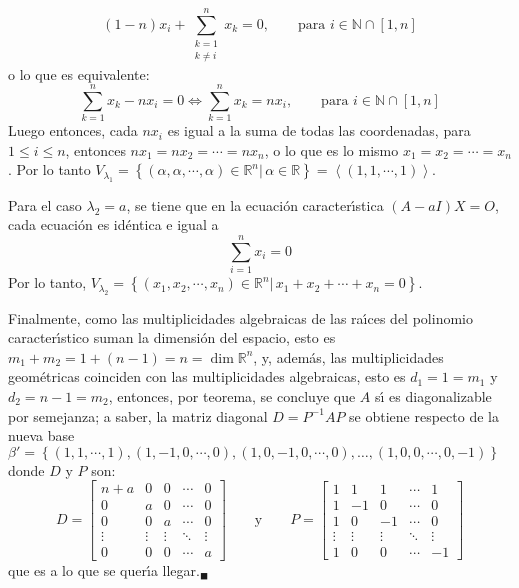\begin{solucion}
 \begin{equation*}
  (1-n)x_i + \sum_{\substack{k=1\\k\neq i}}^n x_k = 0, \qquad \text{para } i \in \mathbb{N}\cap[1, n]
 \end{equation*}
 o lo que es equivalente:
 \begin{equation*}
  \sum_{k=1}^n x_k - nx_i = 0
  \Leftrightarrow 
  \sum_{k=1}^n x_k = nx_i
  , \qquad \text{para } i \in \mathbb{N}\cap [1,n]
 \end{equation*}
 Luego entonces, cada $nx_i$ es igual a la suma de todas las coordenadas, para $1\leq i \leq n$, entonces $nx_1 = nx_2 = \cdots = nx_n$, o lo que es lo mismo $x_1 = x_2 = \cdots = x_n$. Por lo tanto $V_{\lambda_1} = \left\{ (\alpha, \alpha, \cdots, \alpha) \in \mathbb{R}^n | \, \alpha \in \mathbb{R} \right\} = \left< (1, 1, \cdots , 1) \right>$.
 \par 
 Para el caso $\lambda_2 = a$, se tiene que en la ecuaci\'on caracter\'{\i}stica $(A - aI)X = O$, cada ecuaci\'on es id\'entica e igual a
 \begin{equation*}
  \sum_{i=1}^n x_i = 0
 \end{equation*}
 Por lo tanto, $V_{\lambda_2} = \left\{ (x_1, x_2, \cdots, x_n) \in \mathbb{R}^n | \, x_1 + x_2 + \cdots + x_n = 0 \right\}$.
 \par 
 Finalmente, como las multiplicidades algebraicas de las ra\'{\i}ces del polinomio caracter\'{\i}stico suman la dimensi\'on del espacio, esto es $m_1 + m_2 = 1 + (n-1) = n = \dim \mathbb{R}^n$, y, adem\'as, las multiplicidades geom\'etricas coinciden con las multiplicidades algebraicas, esto es $d_1 = 1 = m_1$ y $d_2 = n-1 = m_2$, entonces, por teorema, se concluye que $A$ s\'{\i} es diagonalizable por semejanza; a saber, la matriz diagonal $D = P^{-1}AP$ se obtiene respecto de la nueva base $\beta' = \left\{ (1, 1, \cdots, 1), (1, -1, 0, \cdots, 0), (1, 0, -1, 0, \cdots, 0), \ldots, (1, 0, 0, \cdots, 0, -1) \right\}$ donde $D$ y $P$ son:
 \begin{equation*}
  D = 
  \begin{bmatrix}
   n+a & 0 & 0 & \cdots & 0 \\
   0   & a & 0 & \cdots & 0 \\
   0   & 0 & a & \cdots & 0 \\
   \vdots & \vdots & \vdots & \ddots & \vdots \\
   0   & 0 & 0 & \cdots & a
  \end{bmatrix}
  \qquad \text{y} \qquad 
  P = 
  \begin{bmatrix}
   1 &  1 &  1 & \cdots &  1 \\
   1 & -1 &  0 & \cdots &  0 \\
   1 &  0 & -1 & \cdots &  0 \\
   \vdots & \vdots & \vdots & \ddots & \vdots \\
   1 &  0 &  0 & \cdots & -1
  \end{bmatrix}
 \end{equation*}
 que es a lo que se quer\'{\i}a llegar.${}_{\blacksquare}$
 
 
\end{solucion}

